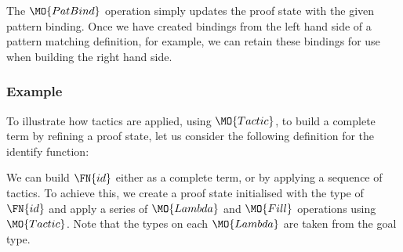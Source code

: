 The $\MO{PatBind}$ operation simply updates the proof state with the given pattern
binding. Once we have created bindings from the left hand side of a pattern
matching definition, for example, we can retain these bindings for use when
building the right hand side.

\subsubsection{Example}

To illustrate how tactics are applied, using $\MO{Tactic}$, to build a
complete term by refining a proof state, let us consider the following
\TT{} definition for the identify function:


We can build $\FN{id}$ either as a complete term, or by applying a sequence of
tactics.  To achieve this, we create a proof state initialised with the type of
$\FN{id}$ and apply a series of $\MO{Lambda}$ and $\MO{Fill}$ operations using
$\MO{Tactic}$.  Note that the types on each $\MO{Lambda}$ are taken from
the goal type.


